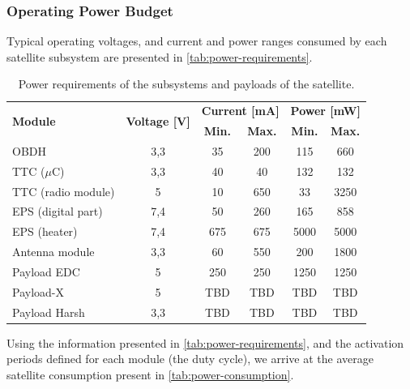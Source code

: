 \subsubsection{Operating Power Budget}

Typical operating voltages, and current and power ranges consumed by each satellite subsystem are presented in \autoref{tab:power-requirements}.

\begin{table}[!h]
    \centering
    \begin{tabular}{lccccc}
        \toprule[1.5pt]
        \multirow{2}{*}{\textbf{Module}} & \multirow{2}{*}{\textbf{Voltage [V]}}    & \multicolumn{2}{c}{\textbf{Current [mA]}} & \multicolumn{2}{c}{\textbf{Power [mW]}} \\
                                         &                                          & \textbf{Min.} & \textbf{Max.}             & \textbf{Min.} & \textbf{Max.} \\
        \midrule
        OBDH                & 3,3   & 35    & 200   & 115   & 660 \\
        TTC ($\mu$C)        & 3,3   & 40    & 40    & 132   & 132 \\
        TTC (radio module)  & 5     & 10    & 650   & 33    & 3250 \\
        EPS (digital part)  & 7,4   & 50    & 260   & 165   & 858 \\
        EPS (heater)        & 7,4   & 675   & 675   & 5000  & 5000 \\
        Antenna module      & 3,3   & 60    & 550   & 200   & 1800 \\
        Payload EDC         & 5     & 250   & 250   & 1250  & 1250 \\
        Payload-X           & 5     & TBD   & TBD   & TBD   & TBD \\
        Payload Harsh       & 3,3   & TBD   & TBD   & TBD   & TBD \\
        \bottomrule[1.5pt]
    \end{tabular}
    \caption{Power requirements of the subsystems and payloads of the satellite.}
    \label{tab:power-requirements}
\end{table}

Using the information presented in \autoref{tab:power-requirements}, and the activation periods defined for each module (the duty cycle), we arrive at the average satellite consumption present in \autoref{tab:power-consumption}.

